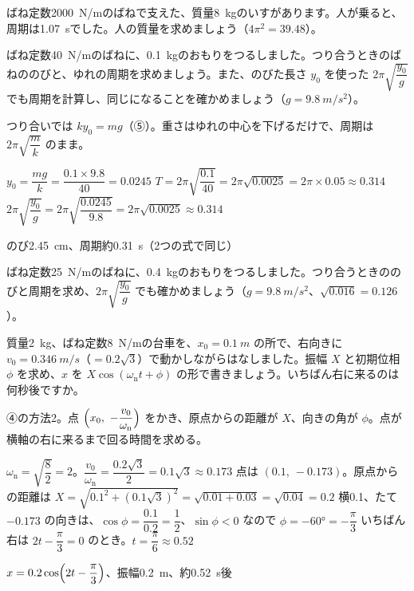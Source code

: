 \begin{jibun}
ばね定数\qty{2000}{N/m}のばねで支えた、質量\qty{8}{kg}のいすがあります。人が乗ると、周期は\qty{1.07}{s}でした。人の質量を求めましょう（$4\pi^2=39.48$）。
\end{jibun}

\begin{reidai}
ばね定数\qty{40}{N/m}のばねに、\qty{0.1}{kg}のおもりをつるしました。つり合うときのばねののびと、ゆれの周期を求めましょう。また、のびた長さ $y_0$ を使った $2\pi\sqrt{\dfrac{y_0}{g}}$ でも周期を計算し、同じになることを確かめましょう（$g=\qty{9.8}{m/s^2}$）。\par
\kangaekata つり合いでは $ky_0=mg$（⑤）。重さはゆれの中心を下げるだけで、周期は $2\pi\sqrt{\dfrac{m}{k}}$ のまま。\par
\shiki
\kviga $y_0=\dfrac{mg}{k}=\dfrac{0.1\times9.8}{40}=0.0245$
\kviga $T=2\pi\sqrt{\dfrac{0.1}{40}}=2\pi\sqrt{0.0025}=2\pi\times0.05\approx0.314$
\kviga $2\pi\sqrt{\dfrac{y_0}{g}}=2\pi\sqrt{\dfrac{0.0245}{9.8}}=2\pi\sqrt{0.0025}\approx0.314$\par
\kotae のび\qty{2.45}{cm}、周期約\qty{0.31}{s}（2つの式で同じ）
\end{reidai}

\begin{jibun}
ばね定数\qty{25}{N/m}のばねに、\qty{0.4}{kg}のおもりをつるしました。つり合うときののびと周期を求め、$2\pi\sqrt{\dfrac{y_0}{g}}$ でも確かめましょう（$g=\qty{9.8}{m/s^2}$、$\sqrt{0.016}=0.126$）。
\end{jibun}

\begin{reidai}
質量\qty{2}{kg}、ばね定数\qty{8}{N/m}の台車を、$x_0=\qty{0.1}{m}$ の所で、右向きに $v_0=\qty{0.346}{m/s}$（$=0.2\sqrt3$）で動かしながらはなしました。振幅 $X$ と初期位相 $\phi$ を求め、$x$ を $X\cos(\omega_{\mathrm n}t+\phi)$ の形で書きましょう。いちばん右に来るのは何秒後ですか。\par
\kangaekata ④の方法2。点 $\Bigl(x_0,\ -\dfrac{v_0}{\omega_{\mathrm n}}\Bigr)$ をかき、原点からの距離が $X$、向きの角が $\phi$。点が横軸の右に来るまで回る時間を求める。\par
\shiki
\kviga $\omega_{\mathrm n}=\sqrt{\dfrac{8}{2}}=2$。$\dfrac{v_0}{\omega_{\mathrm n}}=\dfrac{0.2\sqrt3}{2}=0.1\sqrt3\approx0.173$
\kviga 点は $(0.1,\ -0.173)$。原点からの距離は
\kvigb $X=\sqrt{0.1^2+(0.1\sqrt3)^2}=\sqrt{0.01+0.03}=\sqrt{0.04}=0.2$
\kviga 横0.1、たて $-0.173$ の向きは、$\cos\phi=\dfrac{0.1}{0.2}=\dfrac{1}{2}$、$\sin\phi<0$ なので $\phi=-60°=-\dfrac{\pi}{3}$
\kviga いちばん右は $2t-\dfrac{\pi}{3}=0$ のとき。$t=\dfrac{\pi}{6}\approx0.52$\par
\kotae $x=0.2\cos\Bigl(2t-\dfrac{\pi}{3}\Bigr)$、振幅\qty{0.2}{m}、約\qty{0.52}{s}後
\end{reidai}

